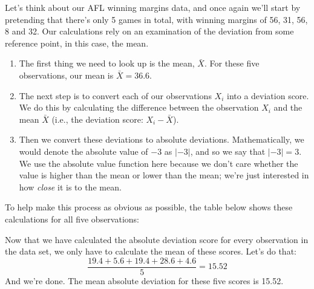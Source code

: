 \documentclass[
  11pt,
  a4paper,
  twoside,symmetric,openright]{book}
\providecommand{\tightlist}{%
  \setlength{\itemsep}{0pt}\setlength{\parskip}{0pt}}
\theoremstyle{break}
\theoremstyle{break}
\begin{document}
\begin{example}
\protect\hypertarget{exm:exAAD}{}\label{exm:exAAD}Let's think about our AFL winning margins data, and once again we'll start by pretending that there's only 5 games in total, with winning margins of 56, 31, 56, 8 and 32. Our calculations rely on an examination of the deviation from some reference point, in this case, the mean.

\begin{enumerate}
\def\labelenumi{\arabic{enumi}.}
\tightlist
\item
  The first thing we need to look up is the mean, \(\bar{X}\). For these five observations, our mean is \(\bar{X} = 36.6\).
\item
  The next step is to convert each of our observations \(X_i\) into a deviation score. We do this by calculating the difference between the observation \(X_i\) and the mean \(\bar{X}\) (i.e., the deviation score: \(X_i - \bar{X}\)).
\item
  Then we convert these deviations to absolute deviations. Mathematically, we would denote the absolute value of \(-3\) as \(|-3|\), and so we say that \(|-3| = 3\). We use the absolute value function here because we don't care whether the value is higher than the mean or lower than the mean; we're just interested in how \emph{close} it is to the mean.
\end{enumerate}

To help make this process as obvious as possible, the table below shows these calculations for all five observations:

\begin{table}[H]
\centering
{}
\end{table}

Now that we have calculated the absolute deviation score for every observation in the data set, we only have to calculate the mean of these scores. Let's do that:
\[
\frac{19.4 + 5.6 + 19.4 + 28.6 + 4.6}{5} = 15.52
\]
And we're done. The mean absolute deviation for these five scores is 15.52.
\end{example}
\end{document}
